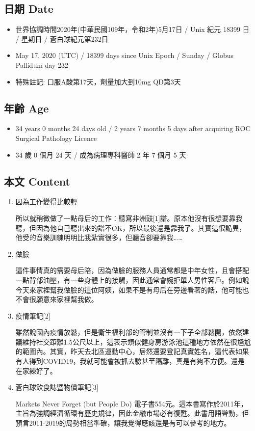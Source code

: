 \documentclass[a5paper, 12pt
]{book}
\providecommand{\tightlist}{%
  \setlength{\itemsep}{0pt}\setlength{\parskip}{0pt}}
\begin{document}
\hypertarget{ux65e5ux671f-date-77}{%
\subsection{日期 Date}\label{ux65e5ux671f-date-77}}

\begin{itemize}
\tightlist
\item
  世界協調時間2020年(中華民國109年，令和2年)5月17日 / Unix 紀元 18399 日
  / 星期日 / 蒼白球紀元第232日
\item
  May 17, 2020 (UTC) / 18399 days since Unix Epoch / Sunday / Globus
  Pallidum day 232
\item
  特殊註記: 口服A酸第17天，劑量加大到10mg QD第3天
\end{itemize}

\hypertarget{ux5e74ux9f61-age-77}{%
\subsection{年齡 Age}\label{ux5e74ux9f61-age-77}}

\begin{itemize}
\tightlist
\item
  34 years 0 months 24 days old / 2 years 7 months 5 days after
  acquiring ROC Surgical Pathology Licence
\item
  34 歲 0 個月 24 天 / 成為病理專科醫師 2 年 7 個月 5 天
\end{itemize}

\hypertarget{ux672cux6587-content-77}{%
\subsection{本文 Content}\label{ux672cux6587-content-77}}

\begin{enumerate}
\def\labelenumi{\arabic{enumi}.}
\item
  因為工作變得比較輕

  所以就稍微做了一點母后的工作：聽寫非洲鼓{[}1{]}譜。原本他沒有很想要靠我聽，但因為他自己聽出來的譜不OK，所以最後還是靠我了。其實這很詭異，他受的音樂訓練明明比我紮實很多，但聽音卻要靠我\ldots\ldots{}
\item
  做臉

  這件事情真的需要母后陪，因為做臉的服務人員通常都是中年女性，且會搭配一點背部油壓，有一些身體上的接觸，因此通常會婉拒單人男性客戶。例如說今天來家裡幫我做臉的這位阿姨，如果不是有母后在旁邊看著的話，他可能也不會很願意來家裡幫我做。
\item
  疫情筆記{[}2{]}

  雖然說國內疫情放鬆，但是衛生福利部的管制並沒有一下子全部鬆開，依然建議維持社交距離1.5公尺以上，這表示類似健身房游泳池這種地方依然在很尷尬的範圍內。其實，昨天去北區運動中心，居然還要登記真實姓名，這代表如果有人得到COVID19，我就可能會被抓去驗甚至隔離，真是有夠不方便。還是在家練好了。
\item
  蒼白球飲食誌暨物價筆記{[}3{]}

  Markets Never Forget (but People Do)
  電子書554元。這本書寫作於2011年，主旨為強調經濟循環有歷史規律，因此金融市場必有復甦。此書用語聳動，但預言2011-2019的局勢相當準確，讓我覺得應該還是有可以參考的地方。
\end{enumerate}
\end{document}
